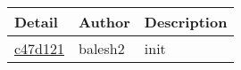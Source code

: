 \begin{tabular}{l l l}\textbf{Detail} & \textbf{Author} & \textbf{Description}\\\hline
\href{https://github.com/balesh2/CS444-4/commit/c47d12140c945ab4ce9f59212c852ec357837a8c}{c47d121} & balesh2 & init\\\hline\end{tabular}
